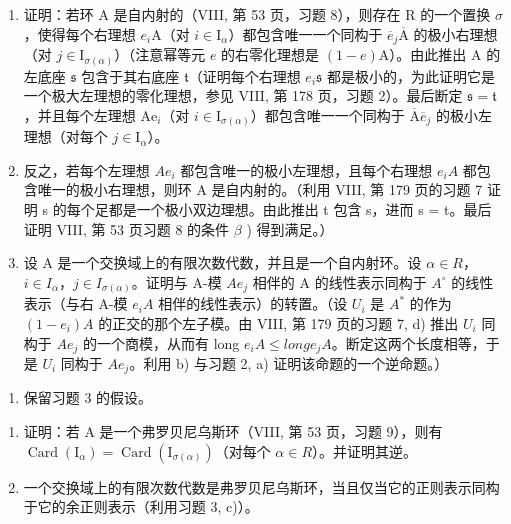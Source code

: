 \begin{enumerate}
\def\labelenumi{\alph{enumi})}
\item
  证明：若环 A 是自内射的（VIII, 第 53 页，习题 8），则存在 R 的一个置换 \(\sigma\)，使得每个右理想 \(e_i\mathrm{A}\)（对 \(i\in \mathrm{I}_{\alpha}\)）都包含唯一一个同构于 \(\overline{e}_j\overline{\mathrm{A}}\) 的极小右理想（对 \(j\in \mathrm{I}_{\sigma (\alpha)}\)）（注意幂等元 \(e\) 的右零化理想是 \((1 - e)\mathrm{A}\)）。由此推出 A 的左底座 \(\mathfrak{s}\) 包含于其右底座 \(\mathfrak{t}\)（证明每个右理想 \(e_i\mathfrak{s}\) 都是极小的，为此证明它是一个极大左理想的零化理想，参见 VIII, 第 178 页，习题 2）。最后断定 \(\mathfrak{s} = \mathfrak{t}\)，并且每个左理想 \(\mathrm{Ae}_i\)（对 \(i\in \mathrm{I}_{\sigma (\alpha)}\)）都包含唯一一个同构于 \(\overline{\mathrm{A}}\overline{e}_j\) 的极小左理想（对每个 \(j\in \mathrm{I}_{\alpha}\)）。
\item
  反之，若每个左理想 \(Ae_{i}\) 都包含唯一的极小左理想，且每个右理想 \(e_{i}A\) 都包含唯一的极小右理想，则环 A 是自内射的。（利用 VIII, 第 179 页的习题 7 证明 s 的每个足都是一个极小双边理想。由此推出 t 包含 s，进而 s = t。最后证明 VIII, 第 53 页习题 8 的条件 \(\beta\) ) 得到满足。）
\item
  设 A 是一个交换域上的有限次数代数，并且是一个自内射环。设 \(\alpha \in R\)，\(i \in I_{\alpha}\)，\(j \in I_{\sigma(\alpha)}\)。证明与 A-模 \(Ae_{j}\) 相伴的 A 的线性表示同构于 \(A^{\circ}\) 的线性表示（与右 A-模 \(e_{i}A\) 相伴的线性表示）的转置。（设 \(U_{i}\) 是 \(A^{*}\) 的作为 \((1 - e_{i})A\) 的正交的那个左子模。由 VIII, 第 179 页的习题 7, d) 推出 \(U_{i}\) 同构于 \(Ae_{j}\) 的一个商模，从而有 long \(e_{i}A \leqslant long e_{j}A\)。断定这两个长度相等，于是 \(U_{i}\) 同构于 \(Ae_{j}\)。利用 b) 与习题 2, a) 证明该命题的一个逆命题。）
\end{enumerate}

\begin{enumerate}
\def\labelenumi{\arabic{enumi})}
\setcounter{enumi}{3}
\tightlist
\item
  保留习题 3 的假设。
\end{enumerate}

\begin{enumerate}
\def\labelenumi{\alph{enumi})}
\item
  证明：若 A 是一个弗罗贝尼乌斯环（VIII, 第 53 页，习题 9），则有 \(\operatorname{Card}(\mathrm{I}_{\alpha}) = \operatorname{Card}(\mathrm{I}_{\sigma(\alpha)})\)（对每个 \(\alpha \in R\)）。并证明其逆。
\item
  一个交换域上的有限次数代数是弗罗贝尼乌斯环，当且仅当它的正则表示同构于它的余正则表示（利用习题 3, c)）。
\end{enumerate}

